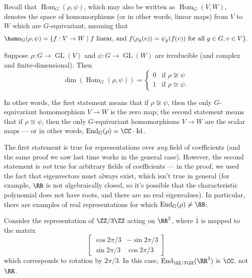 Recall that $\operatorname{Hom}_G(\rho, \psi)$, which may also be written as $\operatorname{Hom}_G(V, W)$, denotes the space of homomorphisms (or in other words, linear maps) from $V$ to $W$ which are $G$-equivariant, meaning that \[\homo_G(\rho, \psi) = \{f : V \to W \mid f \text{ linear, and } f(\rho_g(v)) = \psi_g(f(v)) \text{ for all } g \in G, v \in V\}.\]

\begin{theorem}
Suppose $\rho: G \to \operatorname{GL}(V)$ and $\psi: G \to \operatorname{GL}(W)$ are irreducible (and complex and finite-dimensional). Then \[\dim\left(\operatorname{Hom}_G(\rho, \psi)\right) = \begin{cases} 0 & \text{if } \rho \not\cong \psi \\ 1 & \text{if } \rho \cong \psi.\end{cases}\] 
\end{theorem}

In other words, the first statement means that if $\rho \not\cong \psi$, then the only $G$-equivariant homomorphism $V \to W$ is the zero map; the second statement means that if $\rho \cong \psi$, then the only $G$-equivariant homomorphisms $V \to W$ are the scalar maps --- or in other words, $\operatorname{End}_G(\rho) = \CC\cdot \operatorname{Id}$. 

The first statement is true for representations over \emph{any} field of coefficients (and the same proof we saw last time works in the general case). However, the second statement is \emph{not} true for arbitrary fields of coefficients --- in the proof, we used the fact that eigenvectors must always exist, which isn't true in general (for example, $\RR$ is not algebraically closed, so it's possible that the characteristic polynomial does not have roots, and there are no real eigenvalues). In particular, there are examples of real representations for which $\operatorname{End}_G(\rho) \neq \RR$:

\begin{example}
Consider the representation of $\ZZ/3\ZZ$ acting on $\RR^2$, where $\overline{1}$ is mapped to the matrix \[\begin{bmatrix} \cos 2\pi/3 & -\sin 2\pi/3 \\ \sin 2\pi/3 & \cos 2\pi/3 \end{bmatrix}\] which corresponds to rotation by $2\pi/3$. In this case, $\operatorname{End}_{\ZZ/3\ZZ}(\RR^2)$ is $\CC$, not $\RR$. 
\end{example}

